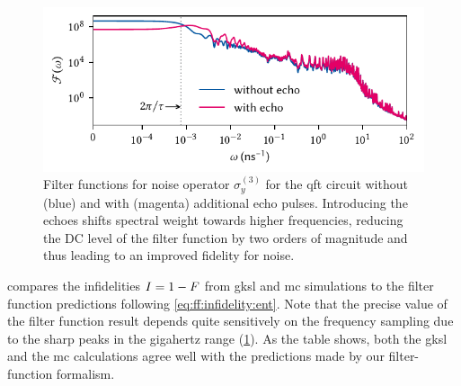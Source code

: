 \begin{figure}
    \centering
    \includegraphics{img/pdf/filter_functions/qft_filter_function_Y3}
    \caption[]{
        Filter functions for noise operator $\sigma_y^{(3)}$ for the \gls{qft} circuit without (blue) and with (magenta) additional echo pulses.
        Introducing the echoes shifts spectral weight towards higher frequencies, reducing the DC level of the filter function by two orders of magnitude and thus leading to an improved fidelity for \oneoverf noise.
    }
    \label{fig:app:qft_ff}
\end{figure}

 compares the infidelities $I=1-F$ from \gls{gksl} and \gls{mc} simulations to the filter function predictions following \cref{eq:ff:infidelity:ent}.
Note that the precise value of the filter function result depends quite sensitively on the frequency sampling due to the sharp peaks in the gigahertz range (\cref{fig:app:qft_ff}).
As the table shows, both the \gls{gksl} and the \gls{mc} calculations agree well with the predictions made by our filter-function formalism.


